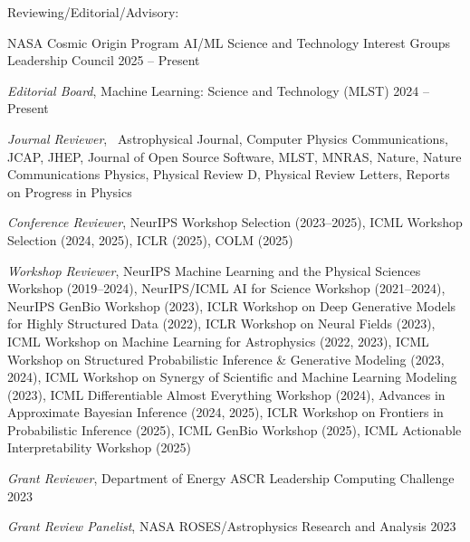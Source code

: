 \documentclass[letterpaper,11pt]{article}
\newenvironment{packed_itemize}{
\begin{itemize}[label=\raisebox{0.25ex}{\tiny$\bullet$}]
  \setlength{\itemsep}{4.0pt}
  \setlength{\parskip}{0pt}
  \setlength{\parsep}{0pt}}{\end{itemize}
}
\begin{document}
  \noindent
Reviewing/Editorial/Advisory:
  \begin{packed_itemize}
  \item NASA Cosmic Origin Program AI/ML Science and Technology Interest Groups Leadership Council \hfill 2025 -- Present
  \item \emph{Editorial Board}, Machine Learning: Science and Technology (MLST) \hfill 2024 -- Present
  \item \emph{Journal Reviewer}, \ \scriptsize{Astrophysical Journal, Computer Physics Communications, JCAP, JHEP,  Journal of Open Source Software, MLST, MNRAS, Nature, Nature Communications Physics, Physical Review {D}, Physical Review {Letters}, Reports on Progress in Physics}\normalsize
    \item \emph{Conference Reviewer}, \scriptsize{NeurIPS Workshop Selection (2023--2025), ICML Workshop Selection (2024, 2025), ICLR (2025), COLM (2025)}\normalsize
  \item \emph{Workshop Reviewer},  \scriptsize{NeurIPS Machine Learning and the Physical Sciences Workshop (2019--2024), NeurIPS/ICML AI for Science Workshop (2021--2024), NeurIPS GenBio Workshop (2023), ICLR Workshop on Deep Generative Models for Highly Structured Data (2022), ICLR Workshop on Neural Fields (2023), ICML Workshop on Machine Learning for Astrophysics (2022, 2023), ICML Workshop on Structured Probabilistic Inference \& Generative Modeling (2023, 2024), ICML Workshop on Synergy of Scientific and Machine Learning Modeling (2023), ICML Differentiable Almost Everything Workshop (2024),  Advances in Approximate Bayesian Inference (2024, 2025), ICLR Workshop on Frontiers in Probabilistic Inference (2025), ICML GenBio Workshop (2025), ICML Actionable Interpretability Workshop (2025)}\normalsize
  \item \emph{Grant Reviewer}, Department of Energy ASCR Leadership Computing Challenge \hfill 2023
  \item \emph{Grant Review Panelist}, NASA ROSES/Astrophysics Research and Analysis \hfill 2023
  
  \end{packed_itemize}


\vspace{3mm}
\end{document}
